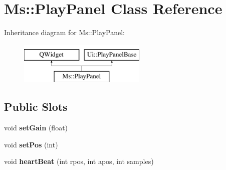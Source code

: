 \hypertarget{class_ms_1_1_play_panel}{}\section{Ms\+:\+:Play\+Panel Class Reference}
\label{class_ms_1_1_play_panel}
Inheritance diagram for Ms\+:\+:Play\+Panel\+:\begin{figure}[H]
\begin{center}
\leavevmode
\includegraphics[height=2.000000cm]{class_ms_1_1_play_panel}
\end{center}
\end{figure}
\subsection*{Public Slots}
\begin{DoxyCompactItemize}
\item 
\mbox{\label{class_ms_1_1_play_panel_a63d8790b9cd37c7419ce8401316bbd4f}} 
void {\bfseries set\+Gain} (float)
\item 
\mbox{\label{class_ms_1_1_play_panel_a0fac2006243aed3dc063b875decce0e8}} 
void {\bfseries set\+Pos} (int)
\item 
\mbox{\label{class_ms_1_1_play_panel_aedd58b5907bf99dd36abb9bc6f6f8c30}} 
void {\bfseries heart\+Beat} (int rpos, int apos, int samples)
\end{DoxyCompactItemize}
